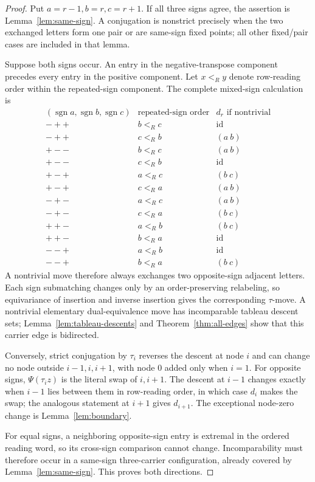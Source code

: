 \documentclass[11pt]{article}
\theoremstyle{definition}
\theoremstyle{remark}
\newcommand{\sgn}{\operatorname{sgn}}
\begin{document}
\begin{proof}
Put $a=r-1,b=r,c=r+1$.  If all three signs agree, the assertion is
Lemma~\ref{lem:same-sign}.  A conjugation is nonstrict precisely when the
two exchanged letters form one pair or are same-sign fixed points; all
other fixed/pair cases are included in that lemma.

Suppose both signs occur.  An entry in the negative-transpose component
precedes every entry in the positive component.  Let $x<_{R}y$ denote
row-reading order within the repeated-sign component.  The complete
mixed-sign calculation is
\[
\begin{array}{c|c|c}
 (\sgn a,\sgn b,\sgn c)&\text{repeated-sign order}&
                           d_r\text{ if nontrivial}\\ \hline
 -++&b<_{R}c&\mathrm{id}\\
 -++&c<_{R}b&(a\ b)\\
 +--&b<_{R}c&(a\ b)\\
 +--&c<_{R}b&\mathrm{id}\\
 +-+&a<_{R}c&(b\ c)\\
 +-+&c<_{R}a&(a\ b)\\
 -+-&a<_{R}c&(a\ b)\\
 -+-&c<_{R}a&(b\ c)\\
 ++-&a<_{R}b&(b\ c)\\
 ++-&b<_{R}a&\mathrm{id}\\
 --+&a<_{R}b&\mathrm{id}\\
 --+&b<_{R}a&(b\ c)
\end{array}
\]
A nontrivial move therefore always exchanges two opposite-sign adjacent
letters.  Each sign submatching changes only by an order-preserving
relabeling, so equivariance of insertion and inverse insertion gives the
corresponding $\tau$-move.  A nontrivial elementary dual-equivalence move
has incomparable tableau descent sets; Lemma~\ref{lem:tableau-descents}
and Theorem~\ref{thm:all-edges} show that this carrier edge is bidirected.

Conversely, strict conjugation by $\tau_i$ reverses the descent at node
$i$ and can change no node outside $i-1,i,i+1$, with node $0$ added only
when $i=1$.  For opposite signs, $\Psi(\tau_i z)$ is the literal swap of
$i,i+1$.  The descent at $i-1$ changes exactly when $i-1$ lies between
them in row-reading order, in which case $d_i$ makes the swap; the
analogous statement at $i+1$ gives $d_{i+1}$.  The exceptional node-zero
change is Lemma~\ref{lem:boundary}.

For equal signs, a neighboring opposite-sign entry is extremal in the
ordered reading word, so its cross-sign comparison cannot change.
Incomparability must therefore occur in a same-sign three-carrier
configuration, already covered by Lemma~\ref{lem:same-sign}.  This proves
both directions.
\end{proof}
\end{document}
